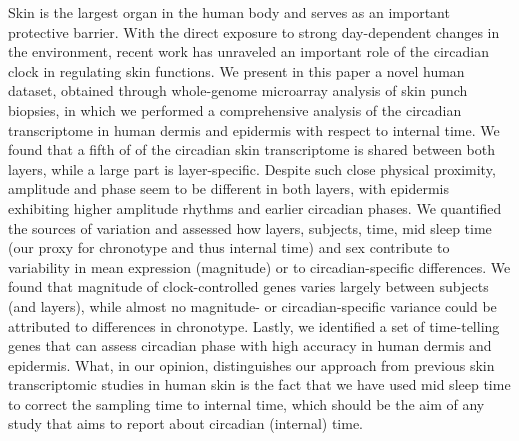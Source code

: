 Skin is the largest organ in the human body and serves as an important protective barrier. With the direct exposure to strong day-dependent changes in the environment, recent work has unraveled an important role of the circadian clock in regulating skin functions. We present in this paper a novel human dataset, obtained through whole-genome microarray analysis of skin punch biopsies, in which we performed a comprehensive analysis of the circadian transcriptome in human dermis and epidermis with respect to internal time. We found that a fifth of of the circadian skin transcriptome is shared between both layers, while a large part is layer-specific. Despite such close physical proximity, amplitude and phase seem to be different in both layers, with epidermis exhibiting higher amplitude rhythms and earlier circadian phases. We quantified the sources of variation and assessed how layers, subjects, time, mid sleep time (our proxy for chronotype and thus internal time) and sex contribute to variability in mean expression (magnitude) or to circadian-specific differences. We found that magnitude of clock-controlled genes varies largely between subjects (and layers), while almost no magnitude- or circadian-specific variance could be attributed to differences in chronotype. Lastly, we identified a set of time-telling genes that can assess circadian phase with high accuracy in human dermis and epidermis. What, in our opinion, distinguishes our approach from previous skin transcriptomic studies in human skin is the fact that we have used mid sleep time to correct the sampling time to internal time, which should be the aim of any study that aims to report about circadian (internal) time. 
